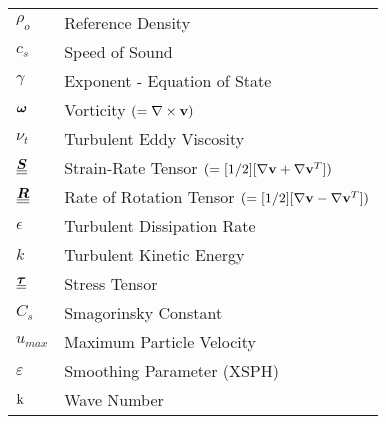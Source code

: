 \begin{longtable}{ll}
$\rho_o$                & Reference Density                 \\
$c_s$                   & Speed of Sound                    \\
$\gamma$                & Exponent - Equation of State      \\
$\bm{\omega}$                   & Vorticity $(=\nabla \times \mathbf{v})$                                                       \\
$\nu_t$                 & Turbulent Eddy Viscosity          \\
$\underline{\underline{\bm{S}}}$                   & Strain-Rate Tensor $(=[1/2][\nabla \mathbf{v} + \nabla \mathbf{v}^T])$                          \\
$\underline{\underline{\bm{R}}}$                   & Rate of Rotation Tensor $(=[1/2][\nabla \mathbf{v} - \nabla \mathbf{v}^T])$                     \\
$\epsilon$              & Turbulent Dissipation Rate        \\
$k$                     & Turbulent Kinetic Energy          \\
$\underline{\underline{\bm{\tau}}}$         & Stress Tensor                     \\
$C_s $                  & Smagorinsky Constant              \\
$u_{max}$               & Maximum Particle Velocity         \\
$\varepsilon$           & Smoothing Parameter (XSPH)        \\
$\mathrm{k}$           & Wave Number                      
\end{longtable}